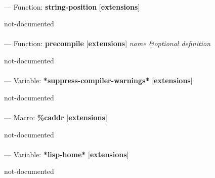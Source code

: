 \paragraph{}
\label{EXTENSIONS:STRING-POSITION}
--- Function: \textbf{string-position} [\textbf{extensions}] \textit{}

\begin{adjustwidth}{5em}{5em}
not-documented
\end{adjustwidth}

\paragraph{}
\label{EXTENSIONS:PRECOMPILE}
--- Function: \textbf{precompile} [\textbf{extensions}] \textit{name \&optional definition}

\begin{adjustwidth}{5em}{5em}
not-documented
\end{adjustwidth}

\paragraph{}
\label{EXTENSIONS:*SUPPRESS-COMPILER-WARNINGS*}
--- Variable: \textbf{*suppress-compiler-warnings*} [\textbf{extensions}] \textit{}

\begin{adjustwidth}{5em}{5em}
not-documented
\end{adjustwidth}

\paragraph{}
\label{EXTENSIONS:CADDR}
--- Macro: \textbf{\%caddr} [\textbf{extensions}] \textit{}

\begin{adjustwidth}{5em}{5em}
not-documented
\end{adjustwidth}

\paragraph{}
\label{EXTENSIONS:*LISP-HOME*}
--- Variable: \textbf{*lisp-home*} [\textbf{extensions}] \textit{}

\begin{adjustwidth}{5em}{5em}
not-documented
\end{adjustwidth}

